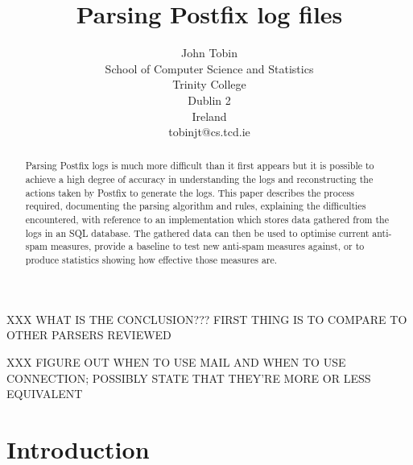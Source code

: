 \documentclass[a4paper,12pt,draft]{article}
\begin{document}
\title{Parsing Postfix log files}
\author{John Tobin \\ School of Computer Science and Statistics \\ 
Trinity College \\ Dublin 2 \\ Ireland \\ tobinjt@cs.tcd.ie}
\date{}
\maketitle

\begin{abstract}

    Parsing Postfix logs is much more difficult than it first appears but
    it is possible to achieve a high degree of accuracy in understanding
    the logs and reconstructing the actions taken by Postfix to generate
    the logs.  This paper describes the process required, documenting the
    parsing algorithm and rules, explaining the difficulties encountered,
    with reference to an implementation which stores data gathered from the
    logs in an SQL database.  The gathered data can then be used to
    optimise current anti-spam measures, provide a baseline to test new
    anti-spam measures against, or to produce statistics showing how
    effective those measures are.

\end{abstract}

XXX WHAT IS THE CONCLUSION???  FIRST THING IS TO COMPARE TO OTHER PARSERS
REVIEWED

XXX FIGURE OUT WHEN TO USE MAIL AND WHEN TO USE CONNECTION\@; POSSIBLY STATE
THAT THEY'RE MORE OR LESS EQUIVALENT

\newpage
\tableofcontents

\newpage
\section{Introduction}

\label{introduction}
\end{document}
